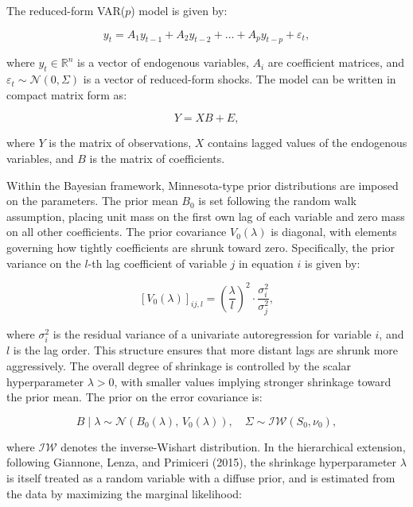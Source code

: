 \documentclass[12pt,a4paper]{report}\usepackage[a4paper, top=2.5cm, bottom=2.5cm, left=2.5cm, right=2.5cm]{geometry}
\begin{document}
The reduced-form VAR($p$) model is given by:

\begin{equation}
y_t = A_1 y_{t-1} + A_2 y_{t-2} + \dots + A_p y_{t-p} + \varepsilon_t,
\end{equation}

where $y_t \in \mathbb{R}^n$ is a vector of endogenous variables, $A_i$ are coefficient
matrices, and $\varepsilon_t \sim \mathcal{N}(0, \Sigma)$ is a vector of reduced-form shocks.
The model can be written in compact matrix form as:

\begin{equation}
Y = X B + E,
\end{equation}

where $Y$ is the matrix of observations, $X$ contains lagged values of the endogenous
variables, and $B$ is the matrix of coefficients.

Within the Bayesian framework, Minnesota-type prior distributions are imposed on the 
parameters. The prior mean $B_0$ is set following the random walk assumption, placing 
unit mass on the first own lag of each variable and zero mass on all other coefficients. 
The prior covariance $V_0(\lambda)$ is diagonal, with elements governing how tightly 
coefficients are shrunk toward zero. Specifically, the prior variance on the $l$-th lag 
coefficient of variable $j$ in equation $i$ is given by:

\begin{equation}
\left[V_0(\lambda)\right]_{ij,l} = 
\left(\frac{\lambda}{l}\right)^2 \cdot \frac{\sigma_i^2}{\sigma_j^2},
\end{equation}

where $\sigma_i^2$ is the residual variance of a univariate autoregression for variable 
$i$, and $l$ is the lag order. This structure ensures that more distant lags are shrunk 
more aggressively. The overall degree of shrinkage is controlled by the scalar 
hyperparameter $\lambda > 0$, with smaller values implying stronger shrinkage toward 
the prior mean. The prior on the error covariance is:

\begin{equation}
B \mid \lambda \sim \mathcal{N}(B_0(\lambda),\, V_0(\lambda)), 
\quad \Sigma \sim \mathcal{IW}(S_0, \nu_0),
\end{equation}

where $\mathcal{IW}$ denotes the inverse-Wishart distribution. In the hierarchical 
extension, following Giannone, Lenza, and Primiceri (2015), the shrinkage hyperparameter 
$\lambda$ is itself treated as a random variable with a diffuse prior, and is estimated 
from the data by maximizing the marginal likelihood:
\end{document}
